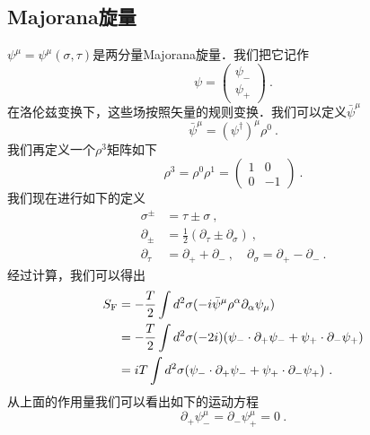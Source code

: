 \subsection{Majorana旋量}
$\psi^\mu = \psi^\mu(\sigma,\tau)$是两分量Majorana旋量．我们把它记作
\begin{equation}
\psi = \begin{pmatrix}
\psi_- \\
\psi_+
\end{pmatrix}~.
\end{equation}
在洛伦兹变换下，这些场按照矢量的规则变换．我们可以定义$\bar\psi^\mu$
\begin{equation}
\bar\psi^\mu = (\psi^\dagger)^\mu \rho^0~.
\end{equation}
我们再定义一个$\rho^3$矩阵如下
\begin{equation}
\rho^3 = \rho^0 \rho^1 = \begin{pmatrix}
1 & 0 \\
0 & -1 
\end{pmatrix}~.
\end{equation}
我们现在进行如下的定义
\begin{equation}
\begin{aligned}
\sigma^{\pm} & = \tau \pm \sigma~, \\
\partial_{\pm} & = \frac{1}{2} (\partial_\tau \pm \partial_\sigma)~, \\
\partial_\tau & = \partial_+ + \partial_-~, \quad \partial_\sigma = \partial_+ - \partial_- ~.
\end{aligned}
\end{equation}
经过计算，我们可以得出
\begin{equation}
\begin{aligned}
S_{\rm F} & = - \frac{T}{2} \int d^2 \sigma (- i \bar \psi^\mu \rho^\alpha \partial_\alpha \psi_\mu ) \\
& = - \frac{T}{2} \int d^2\sigma (-2i) (\psi_-\cdot\partial_+\psi_- + \psi_+\cdot \partial_- \psi_+) \\
& = i T\int d^2\sigma (\psi_-\cdot \partial_+ \psi_- +\psi_+\cdot \partial_- \psi_+ )~.
\end{aligned}
\end{equation}
从上面的作用量我们可以看出如下的运动方程
\begin{equation}
\partial_+\psi^\mu_- = \partial_-\psi^\mu_+ = 0~.
\end{equation}

